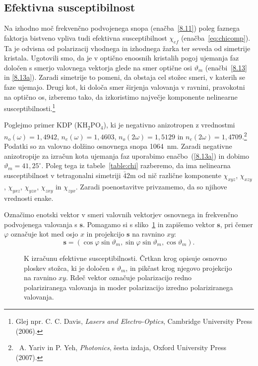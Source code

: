 \subsection*{Efektivna susceptibilnost}
Na izhodno moč frekvenčno podvojenega snopa (enačba~\ref{8.11}) 
poleg faznega faktorja bistveno vpliva tudi efektivna 
susceptibilnost $\chi_{ef}$ (enačba~\ref{eq:chicomp}). Ta je odvisna 
od polarizacij vhodnega in izhodnega žarka ter seveda od simetrije kristala. 
Ugotovili smo, da je v optično enoosnih kristalih pogoj ujemanja faz 
določen s smerjo valovnega vektorja glede na smer optične osi 
$\vartheta_m$ (enačbi~\ref{8.13} in \ref{8.13a}). Zaradi simetrije
to pomeni, da obstaja cel stožec smeri, v katerih se faze ujemajo.
Drugi kot, ki določa smer širjenja valovanja v ravnini, pravokotni na optično os, 
izberemo tako, da izkoristimo največje komponente nelinearne 
susceptibilnosti.\footnote{Glej npr. C. C. Davis, {\it Lasers and Electro-Optics}, 
Cambridge University Press (2006).}

Poglejmo primer KDP (KH$_{2}$PO$_{4}$), ki je negativno anizotropen 
z vrednostmi $n_o(\omega) = 1,4942$, 
$n_e(\omega) = 1,4603$, $n_o(2\omega) = 1,5129$ in $n_e(2\omega) = 
1,4709$.\footnote{~A. Yariv in 
P. Yeh, {\it Photonics}, šesta izdaja, Oxford University Press (2007).}
Podatki so za valovno dolžino osnovnega snopa 1064~nm. 
Zaradi negativne anizotropije za izračun kota ujemanja faz 
uporabimo enačbo~(\ref{8.13a}) in dobimo $\vartheta_m = 41,25^\circ$. 
Poleg tega iz tabele~\ref{table:chi} razberemo, da ima nelinearna susceptibilnost v tetragonalni
simetriji $\bar{4}2$m od nič različne komponente $\chi_{xyz}$, $\chi_{xzy}$, $\chi_{yxz}$,
$\chi_{yzx}$, $\chi_{zxy}$ in $\chi_{zyx}$.
Zaradi poenostavitve privzamemo, da so njihove vrednosti enake. 

Označimo enotski vektor v smeri valovnih vektorjev osnovnega in frekvenčno 
podvojenega valovanja s $\mathbf{s}$. Pomagamo si s sliko~\ref{fig:chi} in zapišemo 
vektor $\mathbf{s}$, pri čemer $\varphi$ označuje kot med osjo $x$ in projekcijo 
$\mathbf{s}$ na ravnino $xy$:
\begin{equation}
\mathbf{s}=(\cos\varphi\sin\vartheta_m,\sin\varphi\sin\vartheta_m,\cos\vartheta_m).
\label{8.14}
\end{equation}

\begin{figure}[ht]
\centering
\def\svgwidth{80truemm} 

\caption{K izračunu efektivne susceptibilnosti. Črtkan krog opisuje osnovno ploskev
stožca, ki je določen s $\vartheta_m$, in pikčast krog njegovo projekcijo
na ravnino $xy$. Rdeč vektor označuje polarizacijo redno polariziranega valovanja in
moder polarizacijo izredno polariziranega valovanja.}
\label{fig:chi}
\end{figure}

